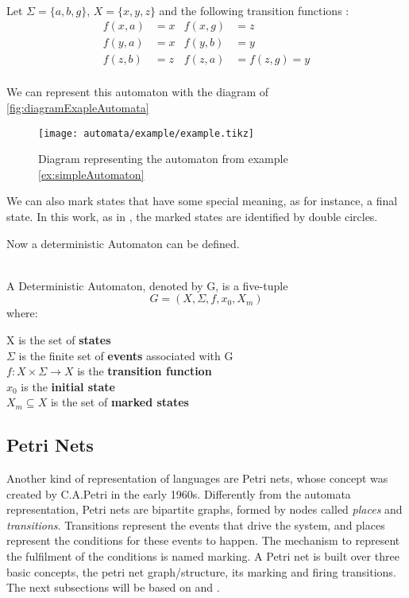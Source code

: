 \begin{example} ~\\
  \label{ex:simpleAutomaton}
  Let $\Sigma = \{a,b,g\}$, $X = \{x,y,z\}$ and the following transition
  functions \citep{cassandras2009introduction}:
  \begin{align*}
   f(x,a)&=x&f(x,g)&=z\\
   f(y,a)&=x&f(y,b)&=y\\
   f(z,b)&=z&f(z,a)&=f(z,g)=y\\
 \end{align*}
\end{example}
We can represent this automaton with the diagram of \autoref{fig:diagramExapleAutomata}
\begin{figure}[H]
  \centering
  \texttt{[image: automata/example/example.tikz]}
  \caption{Diagram representing the automaton from example \ref{ex:simpleAutomaton}}
  \label{fig:diagramExapleAutomata}
\end{figure}
We can also mark states that have some special meaning, as for instance, a final
state. In this work, as in \cite{cassandras2009introduction}, the marked states are identified by double circles.

  
Now a deterministic Automaton can be defined.
\begin{definition}
  \label{def:DeterministicAutomaton}~\\
  A Deterministic Automaton, denoted by G, is a five-tuple
  \[ G = (X,\Sigma,f, x_0,X_m)\] where:

  \indent X is the set of \textbf{states} \\
  \indent $\Sigma$ is the finite set of \textbf{events} associated with G\\
  \indent $f: X \times \Sigma \rightarrow X$ is the \textbf{transition function}  \\
  \indent $x_0$ is the \textbf{initial state} \\
  \indent $X_m \subseteq X $ is the set of \textbf{marked states}

\end{definition}

\subsection{Petri Nets}
\label{sec:petriNets}
Another kind of representation of languages are Petri nets, whose concept was created by C.A.Petri
in the early 1960s. Differently from the automata representation, Petri nets are bipartite graphs, formed by nodes
called \emph{places} and \emph{transitions}.
Transitions represent the events that drive the system, and places represent the
conditions for these events to happen. The mechanism to represent the fulfilment
of the conditions
is named marking. A Petri net is built over three basic concepts, the petri net
graph\slash structure, its marking and firing transitions.
The next subsections will be based on \cite{david2005discrete} and \cite{cassandras2009introduction}.

